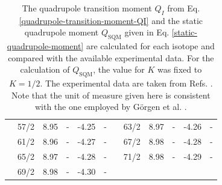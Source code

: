 \begin{table}
{\begin{tabular}{|c|c|c|c|c|c|c|ccccc|}
    & 57/2 & 8.95 & - & -4.25 & - &  & \multicolumn{1}{c|}{63/2} & \multicolumn{1}{c|}{8.97} & \multicolumn{1}{c|}{-} & \multicolumn{1}{c|}{-4.26} & - \\ \cline{2-6} \cline{8-12} 
    & 61/2 & 8.96 & - & -4.27 & - &  & \multicolumn{1}{c|}{67/2} & \multicolumn{1}{c|}{8.98} & \multicolumn{1}{c|}{-} & \multicolumn{1}{c|}{-4.28} & - \\ \cline{2-6} \cline{8-12} 
    & 65/2 & 8.97 & - & -4.28 & - &  & \multicolumn{1}{c|}{71/2} & \multicolumn{1}{c|}{8.98} & \multicolumn{1}{c|}{-} & \multicolumn{1}{c|}{-4.29} & - \\ \cline{2-6} \cline{8-12} 
    & 69/2 & 8.98 & - & -4.30 & - &  & \multicolumn{5}{c|}{} \\ \hline
    \end{tabular}%
    }
    \caption{The quadrupole transition moment $Q_I$ from Eq. \ref{quadrupole-transition-moment-QI} and the static quadrupole moment $Q_\text{SQM}$ given in Eq. \ref{static-quadrupole-moment} are calculated for each isotope and compared with the available experimental data. For the calculation of $Q_\text{SQM}$, the value for $K$ was fixed to $K=1/2$. The experimental data are taken from Refs. \cite{gorgen2004quadrupole,jensen2002wobbling,reich2010nuclear}. Note that the unit of measure given here is consistent with the one employed by Görgen et al. \cite{gorgen2004quadrupole}.}
    \label{table-quadrupole-QI-QSQM-numerical-results}
\end{table}

